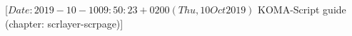 %
%
%
%
%
%
%
%
% 
%
%
%
%

%
                 [$Date: 2019-10-10 09:50:23 +0200 (Thu, 10 Oct 2019) $
                  KOMA-Script guide (chapter: scrlayer-scrpage)]


